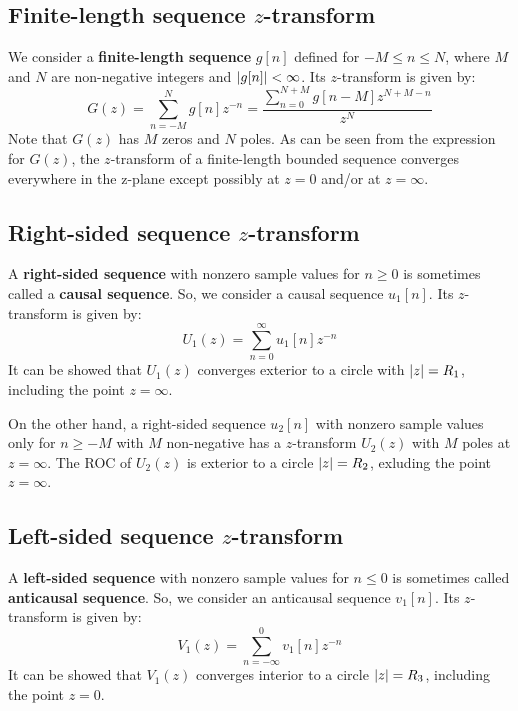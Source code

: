 \documentclass[../../main/main.tex]{subfiles}
\begin{document}
\subsection{\boldmath Finite-length sequence \( z \)-transform}
We consider a \textbf{finite-length sequence} \( g[n] \) defined for \( -M \le n \le N \), where \( M \) and \( N \) are non-negative integers and \( \abs{g[n]} < \infty \).
Its \( z \)-transform is given by:
\begin{equation}
    G(z)
    =
    \sum_{n=-M}^{N} g[n] z^{-n}
    =
    \frac{\displaystyle \sum_{n=0}^{N+M} g[n-M]z^{N+M-n}}{z^{N}}
    \label{eq:L14_S31_1}
\end{equation}
Note that \( G(z) \) has \( M \) zeros and \( N \) poles. As can be seen from the expression for \( G(z) \), the \( z \)-transform of a finite-length bounded sequence converges everywhere in the z-plane except possibly at \( z = 0 \) and/or at \( z = \infty \).



\subsection{\boldmath Right-sided sequence \( z \)-transform}
A \textbf{right-sided sequence} with nonzero sample values for \( n \ge 0 \) is sometimes called a \textbf{causal sequence}. So, we consider a causal sequence \( u_{1}[n] \). Its \( z \)-transform is given by:
\begin{equation}
    U_{1}(z)
    =
    \sum_{n=0}^{\infty} u_{1}[n] z^{-n}
    \label{eq:L14_S32_1}
\end{equation}
It can be showed that \( U_{1}(z) \) converges exterior to a circle with \( \abs{z} = R_{1} \), including the point \( z = \infty \).

On the other hand, a right-sided sequence \( u_{2}[n] \) with nonzero sample values only for \( n \ge -M \) with \( M \) non-negative has a \( z \)-transform \( U_{2}(z) \) with \( M \) poles at \( z = \infty \).
The ROC of \( U_{2}(z) \) is exterior to a circle \( \abs{z} = R_{2} \), exluding the point \( z = \infty \).



\subsection{\boldmath Left-sided sequence \( z \)-transform}
A \textbf{left-sided sequence} with nonzero sample values for \( n \le 0 \) is sometimes called \textbf{anticausal sequence}. So, we consider an anticausal sequence \( v_{1}[n] \). Its \( z \)-transform is given by:
\begin{equation}
    V_{1}(z)
    =
    \sum_{n=-\infty}^{0} v_{1}[n]z^{-n}
    \label{eq:L14_S34_1}
\end{equation}
It can be showed that \( V_{1}(z) \) converges interior to a circle \( \abs{z} = R_{3} \), including the point \( z = 0 \).
\end{document}
